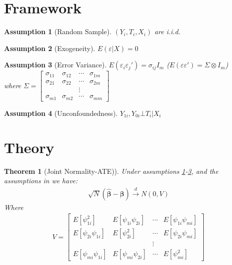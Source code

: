 \documentclass[12pt]{article}
\newtheorem{assumption}{Assumption}
\newtheorem{theorem}{Theorem}
\begin{document}
\section{Framework}
	\begin{assumption}[Random Sample]\label{as:random} $(Y_i,T_i,X_i)$ are i.i.d.\end{assumption}
	\begin{assumption}[Exogeneity]\label{as:exo} $E(\varepsilon|X) = 0$\end{assumption}
	\begin{assumption}[Error Variance]\label{as:var} 
		$E(\varepsilon_i\varepsilon_j') = \sigma_{ij} I_m$ ($E(\varepsilon\varepsilon') = \Sigma \otimes I_m$) \\
		where $\Sigma =
		\begin{bmatrix}
		\sigma_{11} & \sigma_{12} & \cdots & \sigma_{1m}\\
		\sigma_{21} & \sigma_{22} & \cdots & \sigma_{2m}\\
		&			  &	\vdots & \\
		\sigma_{m1} & \sigma_{m2} & \cdots & \sigma_{mm}
		\end{bmatrix}$
	\end{assumption}
	\begin{assumption}[Unconfoundedness]
		$Y_{1i},Y_{0i}\bot T_i|X_i$
	\end{assumption}
\section{Theory}
\begin{theorem}[Joint Normality-ATE)]\label{norm:ate}
	Under assumptions \ref{as:random}-\ref{as:var}, and the assumptions in \cite{chernozhukov2018double} we have: 
	\begin{align*}
	\sqrt{N}(\hat{\pmb{\beta}} - \pmb{\beta}) \xrightarrow[]{d} N(0,V)
	\end{align*}
	Where
	\begin{align*}
	V = 
	\begin{bmatrix}
	E[\psi_{1i}^2] 	& E[\psi_{1i}\psi_{2i}] & \cdots & E[\psi_{1i}\psi_{mi}] \\
	E[\psi_{2i}\psi_{1i}] & E[\psi_{2i}^2] 	  & \cdots & E[\psi_{2i}\psi_{mi}] \\
	&			  	  &	\vdots & \\
	E[\psi_{mi}\psi_{1i}] & E[\psi_{mi}\psi_{2i}] & \cdots & E[\psi_{mi}^2]
	\end{bmatrix}
	\end{align*}
\end{theorem}
\end{document}
